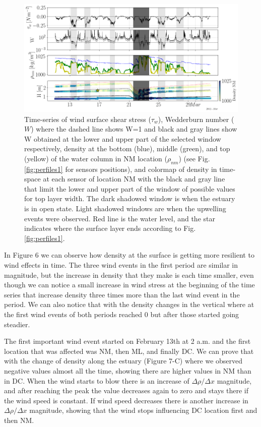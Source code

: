 \documentclass[tesis.tex]{subfiles}
\begin{document}
\begin{figure}[h!]
    \centering
    \includegraphics[width=\textwidth]{Imagenes/wedd.png}
    \caption{Time-series of wind surface shear stress ($\tau_w$), Wedderburn number ($W$) where the dashed line shows W=1 and black and gray lines show W obtained at the lower and upper part of the selected window respectively, density at the bottom (blue), middle (green), and top (yellow) of the water column in NM location ($\rho_{nm}$) (see Fig. \ref{fig:perfiles1} for sensors positions), and colormap of density in time-space at each sensor of location NM with the black and gray line that limit the lower and upper part of the window of possible values for top layer width. The dark shadowed window is when the estuary is in open state. Light shadowed windows are when the upwelling events were observed. Red line is the water level, and the star indicates where the surface layer ends according to Fig. \ref{fig:perfiles1}.}
    \label{fig:wedd}
\end{figure}

In Figure 6 we can observe how density at the surface is getting more resilient to wind effects in time. The three wind events in the first period are similar in magnitude, but the increase in density that they make is each time smaller, even though we can notice a small increase in wind stress at the beginning of the time series that increase density three times more than the last wind event in the period. We can also notice that with the density changes in the vertical where at the first wind events of both periods reached 0 but after those started going steadier.

The first important wind event started on February 13th at 2 a.m. and the first location that was affected was NM, then ML, and finally DC. We can prove that with the change of density along the estuary (Figure 7-C) where we observed negative values almost all the time, showing there are higher values in NM than in DC. When the wind starts to blow there is an increase of $\Delta \rho/\Delta x$ magnitude, and after reaching the peak the value decreases again to zero and stays there if the wind speed is constant. If wind speed decreases there is another increase in $\Delta \rho/\Delta x$ magnitude, showing that the wind stops influencing DC location first and then NM.
\end{document}
